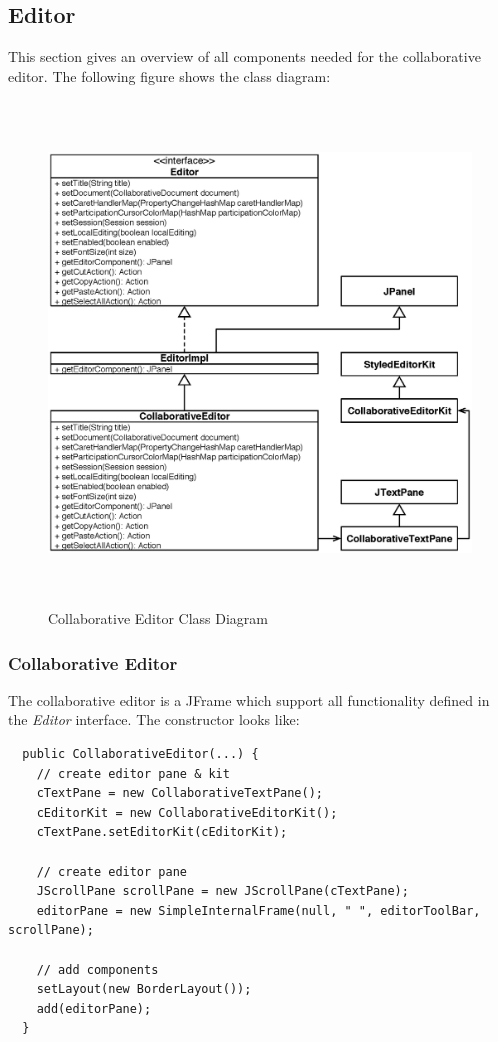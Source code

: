 \subsection{Editor}
This section gives an overview of all components needed for the collaborative editor. The following figure shows the class diagram:
\begin{figure}[H]
\begin{center}
  \includegraphics[height=5.25in, width=5.55in]{../images/finalreport/application_editor.eps}
\caption{Collaborative Editor Class Diagram}
\label{application_editor}
\end{center}
\end{figure}

\subsubsection{Collaborative Editor}
The collaborative editor is a JFrame which support all functionality defined in the \textit{Editor} interface. The constructor looks like:
\begin{verbatim}
  public CollaborativeEditor(...) {
    // create editor pane & kit
    cTextPane = new CollaborativeTextPane();
    cEditorKit = new CollaborativeEditorKit();
    cTextPane.setEditorKit(cEditorKit);

    // create editor pane
    JScrollPane scrollPane = new JScrollPane(cTextPane);
    editorPane = new SimpleInternalFrame(null, " ", editorToolBar, scrollPane);

    // add components		
    setLayout(new BorderLayout());
    add(editorPane);    
  }
\end{verbatim}

